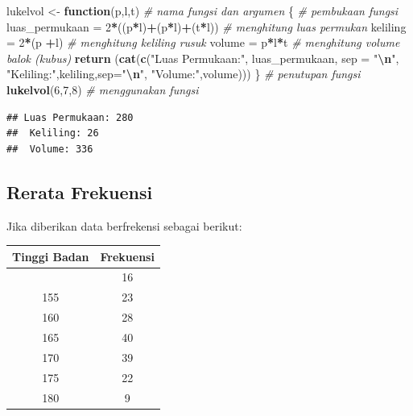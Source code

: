 \documentclass[
]{book}
\newenvironment{Shaded}{\begin{snugshade}}{\end{snugshade}}
\newcommand{\AttributeTok}[1]{\textcolor[rgb]{0.13,0.29,0.53}{#1}}
\newcommand{\CommentTok}[1]{\textcolor[rgb]{0.56,0.35,0.01}{\textit{#1}}}
\newcommand{\ControlFlowTok}[1]{\textcolor[rgb]{0.13,0.29,0.53}{\textbf{#1}}}
\newcommand{\DecValTok}[1]{\textcolor[rgb]{0.00,0.00,0.81}{#1}}
\newcommand{\FunctionTok}[1]{\textcolor[rgb]{0.13,0.29,0.53}{\textbf{#1}}}
\newcommand{\NormalTok}[1]{#1}
\newcommand{\OtherTok}[1]{\textcolor[rgb]{0.56,0.35,0.01}{#1}}
\newcommand{\SpecialCharTok}[1]{\textcolor[rgb]{0.81,0.36,0.00}{\textbf{#1}}}
\newcommand{\StringTok}[1]{\textcolor[rgb]{0.31,0.60,0.02}{#1}}
\begin{document}
\begin{Shaded}
\begin{Highlighting}[]
\NormalTok{lukelvol }\OtherTok{\textless{}{-}} \ControlFlowTok{function}\NormalTok{(p,l,t)                  }\CommentTok{\# nama fungsi dan argumen}
\NormalTok{\{                                            }\CommentTok{\# pembukaan fungsi}
\NormalTok{  luas\_permukaan }\OtherTok{=} \DecValTok{2}\SpecialCharTok{*}\NormalTok{((p}\SpecialCharTok{*}\NormalTok{l)}\SpecialCharTok{+}\NormalTok{(p}\SpecialCharTok{*}\NormalTok{l)}\SpecialCharTok{+}\NormalTok{(t}\SpecialCharTok{*}\NormalTok{l))     }\CommentTok{\# menghitung luas permukan}
\NormalTok{  keliling }\OtherTok{=} \DecValTok{2}\SpecialCharTok{*}\NormalTok{(p }\SpecialCharTok{+}\NormalTok{l)                        }\CommentTok{\# menghitung keliling rusuk}
\NormalTok{  volume }\OtherTok{=}\NormalTok{ p}\SpecialCharTok{*}\NormalTok{l}\SpecialCharTok{*}\NormalTok{t                             }\CommentTok{\# menghitung volume balok (kubus)}
  \FunctionTok{return}\NormalTok{ (}\FunctionTok{cat}\NormalTok{(}\FunctionTok{c}\NormalTok{(}\StringTok{"Luas Permukaan:"}\NormalTok{,}
\NormalTok{                luas\_permukaan, }\AttributeTok{sep =} \StringTok{"}\SpecialCharTok{\textbackslash{}n}\StringTok{"}\NormalTok{, }
                \StringTok{"Keliling:"}\NormalTok{,keliling,}\AttributeTok{sep=}\StringTok{"}\SpecialCharTok{\textbackslash{}n}\StringTok{"}\NormalTok{, }
                \StringTok{"Volume:"}\NormalTok{,volume)))  }
\NormalTok{\}                                            }\CommentTok{\# penutupan fungsi}
\FunctionTok{lukelvol}\NormalTok{(}\DecValTok{6}\NormalTok{,}\DecValTok{7}\NormalTok{,}\DecValTok{8}\NormalTok{)                              }\CommentTok{\# menggunakan fungsi}
\end{Highlighting}
\end{Shaded}

\begin{verbatim}
## Luas Permukaan: 280 
##  Keliling: 26 
##  Volume: 336
\end{verbatim}

\hypertarget{rerata-frekuensi}{%
\subsection{Rerata Frekuensi}\label{rerata-frekuensi}}

Jika diberikan data berfrekensi sebagai berikut:

\begin{longtable}[]{@{}cc@{}}
\toprule\noalign{}
Tinggi Badan & Frekuensi \\
\midrule\noalign{}
\endhead
\bottomrule\noalign{}
\endlastfoot
150 & 16 \\
155 & 23 \\
160 & 28 \\
165 & 40 \\
170 & 39 \\
175 & 22 \\
180 & 9 \\
\end{longtable}
\end{document}
